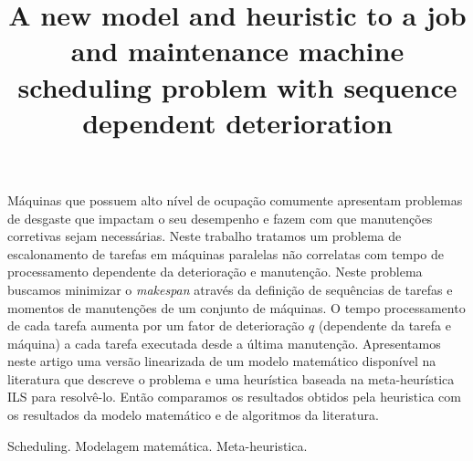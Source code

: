 \documentclass[a4paper,11pt]{article}
\begin{document}
\title{A new model and heuristic to a job and maintenance machine scheduling problem with sequence dependent deterioration } 

\maketitle
\thispagestyle{fancy}

\author{
}

\author{ 
}

\vspace{8mm}
\begin{resumo}
M\'aquinas que possuem alto n\'ivel de ocupa\c c\~ao comumente apresentam problemas de desgaste que impactam o seu desempenho e fazem com que manuten\c c\~oes corretivas sejam necess\'arias. Neste trabalho tratamos um problema de escalonamento de tarefas em m\'aquinas paralelas n\~ao correlatas com tempo de processamento dependente da deteriora\c c\~ao e manuten\c c\~ao. Neste problema buscamos minimizar o \emph{makespan} atrav\'es da defini\c c\~ao de sequ\^encias de tarefas e momentos de manuten\c c\~oes de um conjunto de m\'aquinas. O tempo processamento de cada tarefa aumenta por um fator de deteriora\c c\~ao $q$ (dependente da tarefa e m\'aquina) a cada tarefa executada desde a \'ultima manuten\c c\~ao. Apresentamos neste artigo uma vers\~ao linearizada de um modelo matem\'atico dispon\'ivel na literatura que descreve o problema e uma heur\'istica baseada na meta-heur\'istica ILS para resolv\^e-lo. Ent\~ao comparamos os resultados obtidos pela heuristica com os resultados da modelo matem\'atico e de algoritmos da literatura. 
 \end{resumo}

\bigskip
\begin{palchaves}
Scheduling. Modelagem matem\'atica. Meta-heuristica.

\bigskip
{}
\end{palchaves}


\vspace{8mm}
\end{document}
